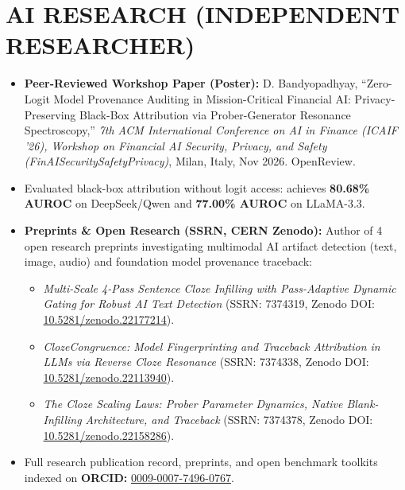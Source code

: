 \documentclass[10pt,a4paper]{article}
\begin{document}
\section{AI RESEARCH (INDEPENDENT RESEARCHER)}
\small
\begin{itemize}[leftmargin=*,noitemsep,topsep=2pt]
    \item \textbf{Peer-Reviewed Workshop Paper (Poster):} D. Bandyopadhyay, ``Zero-Logit Model Provenance Auditing in Mission-Critical Financial AI: Privacy-Preserving Black-Box Attribution via Prober-Generator Resonance Spectroscopy,'' \textit{7th ACM International Conference on AI in Finance (ICAIF '26), Workshop on Financial AI Security, Privacy, and Safety (FinAISecuritySafetyPrivacy)}, Milan, Italy, Nov 2026. OpenReview.
    \item Evaluated black-box attribution without logit access: achieves \textbf{80.68\% AUROC} on DeepSeek/Qwen and \textbf{77.00\% AUROC} on LLaMA-3.3.
    \item \textbf{Preprints \& Open Research (SSRN, CERN Zenodo):} Author of 4 open research preprints investigating multimodal AI artifact detection (text, image, audio) and foundation model provenance traceback:
    \begin{itemize}[leftmargin=*,noitemsep,topsep=1pt]
        \item \textit{Multi-Scale 4-Pass Sentence Cloze Infilling with Pass-Adaptive Dynamic Gating for Robust AI Text Detection} (SSRN: 7374319, Zenodo DOI: \href{https://doi.org/10.5281/zenodo.22177214}{10.5281/zenodo.22177214}).
        \item \textit{ClozeCongruence: Model Fingerprinting and Traceback Attribution in LLMs via Reverse Cloze Resonance} (SSRN: 7374338, Zenodo DOI: \href{https://doi.org/10.5281/zenodo.22113940}{10.5281/zenodo.22113940}).
        \item \textit{The Cloze Scaling Laws: Prober Parameter Dynamics, Native Blank-Infilling Architecture, and Traceback} (SSRN: 7374378, Zenodo DOI: \href{https://doi.org/10.5281/zenodo.22158286}{10.5281/zenodo.22158286}).
    \end{itemize}
    \item Full research publication record, preprints, and open benchmark toolkits indexed on \textbf{ORCID:} \href{https://orcid.org/0009-0007-7496-0767}{0009-0007-7496-0767}.
\end{itemize}
\end{document}
